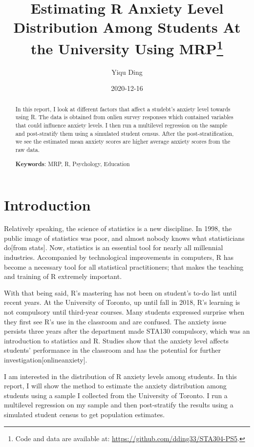 \documentclass[
]{article}
\title{Estimating R Anxiety Level Distribution Among Students At the University
Using MRP\thanks{Code and data are available at:
\url{https://github.com/dding33/STA304-PS5}.}}
\author{Yiqu Ding}
\date{2020-12-16}
\begin{document}
\maketitle
\begin{abstract}
In this report, I look at different factors that affect a studebt's
anxiety level towards using R. The data is obtained from onlien survey
responses which contained variables that could influence anxiety levels.
I then run a multilevel regression on the sample and post-stratify them
using a simulated student census. After the post-stratification, we see
the estimated mean anxiety scores are higher average anxiety scores from
the raw data.

\textbf{Keywords}: MRP, R, Psychology, Education
\end{abstract}

\hypertarget{introduction}{%
\section{Introduction}\label{introduction}}

Relatively speaking, the science of statistics is a new discipline. In
1998, the public image of statistics was poor, and almost nobody knows
what statisticians do{[}from stats{]}. Now, statistics is an essential
tool for nearly all millennial industries. Accompanied by technological
improvements in computers, R has become a necessary tool for all
statistical practitioners; that makes the teaching and training of R
extremely important.

With that being said, R's mastering has not been on student's to-do list
until recent years. At the University of Toronto, up until fall in 2018,
R's learning is not compulsory until third-year courses. Many students
expressed surprise when they first see R's use in the classroom and are
confused. The anxiety issue persists three years after the department
made STA130 compulsory, which was an introduction to statistics and R.
Studies show that the anxiety level affects students' performance in the
classroom and has the potential for further
investigation{[}onlineanxiety{]}.

I am interested in the distribution of R anxiety levels among students.
In this report, I will show the method to estimate the anxiety
distribution among students using a sample I collected from the
University of Toronto. I run a multilevel regression on my sample and
then post-stratify the results using a simulated student census to get
population estimates.
\end{document}

